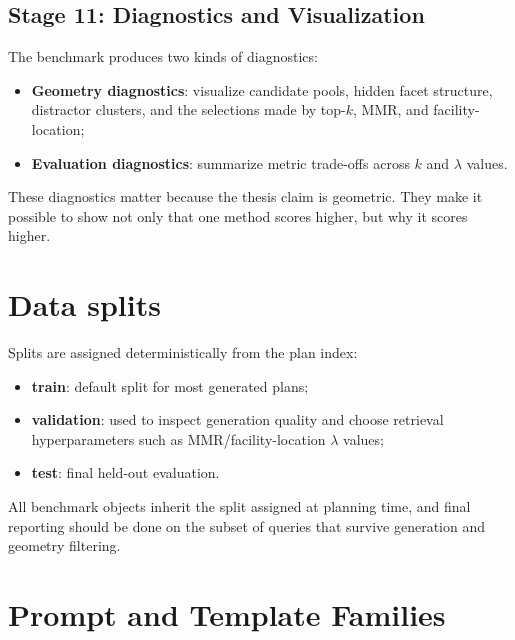 \documentclass[11pt,a4paper]{article}
\newcommand{\stage}[2]{\subsection{\textcolor{betterblue}{#1}: #2}}
\begin{document}
\stage{Stage 11}{Diagnostics and Visualization}

The benchmark produces two kinds of diagnostics:

\begin{itemize}[noitemsep, topsep=0pt]
	\item \textbf{Geometry diagnostics}: visualize candidate pools, hidden facet structure, distractor clusters, and the selections made by top-$k$, MMR, and facility-location;
	\item \textbf{Evaluation diagnostics}: summarize metric trade-offs across $k$ and $\lambda$ values.
\end{itemize}

These diagnostics matter because the thesis claim is geometric. They make it possible to show not only that one method scores higher, but why it scores higher.

\section{Data splits}

Splits are assigned deterministically from the plan index:

\begin{itemize}[noitemsep, topsep=0pt]
	\item \textbf{train}: default split for most generated plans;
	\item \textbf{validation}: used to inspect generation quality and choose retrieval hyperparameters such as MMR/facility-location $\lambda$ values;
	\item \textbf{test}: final held-out evaluation.
\end{itemize}

All benchmark objects inherit the split assigned at planning time, and final reporting should be done on the subset of queries that survive generation and geometry filtering.

\section{Prompt and Template Families}
\end{document}
